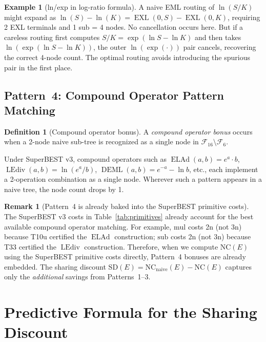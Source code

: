 \documentclass[12pt,a4paper]{article}
\theoremstyle{definition}
\newtheorem{definition}[theorem]{Definition}
\newtheorem{remark}[theorem]{Remark}
\newtheorem{example}[theorem]{Example}
\newcommand{\EXL}{\operatorname{EXL}}
\newcommand{\DEML}{\operatorname{DEML}}
\newcommand{\ELAd}{\operatorname{ELAd}}
\newcommand{\LEdiv}{\operatorname{LEdiv}}
\newcommand{\NC}{\mathrm{NC}}
\newcommand{\SD}{\mathrm{SD}}
\begin{document}
\begin{example}[ln/exp in log-ratio formula]
A naive EML routing of $\ln(S/K)$ might expand as
$\ln(S) - \ln(K) = \EXL(0,S) - \EXL(0,K)$, requiring 2 EXL terminals
and 1 sub = 4 nodes.  No cancellation occurs here.  But if a careless
routing first computes $S/K = \exp(\ln S - \ln K)$ and then takes
$\ln(\exp(\ln S - \ln K))$, the outer $\ln(\exp(\cdot))$ pair cancels,
recovering the correct 4-node count.  The optimal routing avoids
introducing the spurious pair in the first place.
\end{example}

\subsection{Pattern~4: Compound Operator Pattern Matching}
\label{sec:p4}

\begin{definition}[Compound operator bonus]
A \emph{compound operator bonus} occurs when a 2-node naive sub-tree
is recognized as a single node in $\mathcal{F}_{16} \setminus \mathcal{F}_6$.
\end{definition}

Under SuperBEST v3, compound operators such as $\ELAd(a,b) = e^a \cdot b$,
$\LEdiv(a,b) = \ln(e^a/b)$, $\DEML(a,b) = e^{-a} - \ln b$, etc., each
implement a 2-operation combination as a single node.  Wherever such a
pattern appears in a naive tree, the node count drops by 1.

\begin{remark}[Pattern~4 is already baked into the SuperBEST primitive costs]
The SuperBEST v3 costs in Table~\ref{tab:primitives} already account for
the best available compound operator matching.  For example, $\mathrm{mul}$
costs 2n (not 3n) because T10u certified the $\ELAd$ construction; $\mathrm{sub}$
costs 2n (not 3n) because T33 certified the $\LEdiv$ construction.  Therefore,
when we compute $\NC(E)$ using the SuperBEST primitive costs directly, Pattern~4
bonuses are already embedded.  The sharing discount $\SD(E) = \NC_{\mathrm{naive}}(E) - \NC(E)$
captures only the \emph{additional} savings from Patterns~1--3.
\end{remark}

\section{Predictive Formula for the Sharing Discount}
\label{sec:formula}
\end{document}
